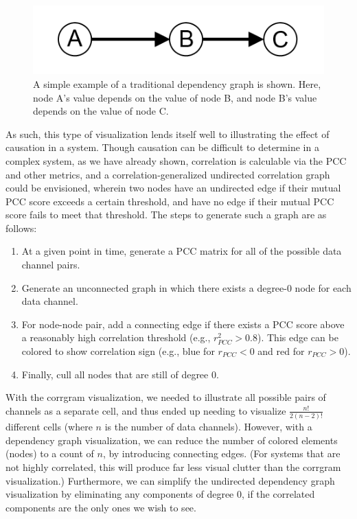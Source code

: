\begin{figure}[h]
\centering
    \includegraphics{images/dependency_graph_example.png}
    \caption{A simple example of a traditional dependency graph is shown. Here, node A's value depends on the value of node B, and node B's value depends on the value of node C.}
    \label{fig:dependency_graph_example}
\end{figure}

As such, this type of visualization lends itself well to illustrating the effect of causation in a system. Though causation can be difficult to determine in a complex system, as we have already shown, correlation is calculable via the PCC and other metrics, and a correlation-generalized undirected correlation graph could be envisioned, wherein two nodes have an undirected edge if their mutual PCC score exceeds a certain threshold, and have no edge if their mutual PCC score fails to meet that threshold. The steps to generate such a graph are as follows:

\begin{enumerate}
    \item At a given point in time, generate a PCC matrix for all of the possible data channel pairs.
    \item Generate an unconnected graph in which there exists a degree-0 node for each data channel.
    \item For node-node pair, add a connecting edge if there exists a PCC score above a reasonably high correlation threshold (e.g., $r_{PCC}^{2} > 0.8$). This edge can be colored to show correlation sign (e.g., blue for $r_{PCC} < 0$ and red for $r_{PCC} > 0$).
    \item Finally, cull all nodes that are still of degree 0.
\end{enumerate}

With the corrgram visualization, we needed to illustrate all possible pairs of channels as a separate cell, and thus ended up needing to visualize $\frac{n!}{2 (n - 2)!}$ different cells (where $n$ is the number of data channels). However, with a dependency graph visualization, we can reduce the number of colored elements (nodes) to a count of $n$, by introducing connecting edges. (For systems that are not highly correlated, this will produce far less visual clutter than the corrgram visualization.) Furthermore, we can simplify the undirected dependency graph visualization by eliminating any components of degree 0, if the correlated components are the only ones we wish to see.


